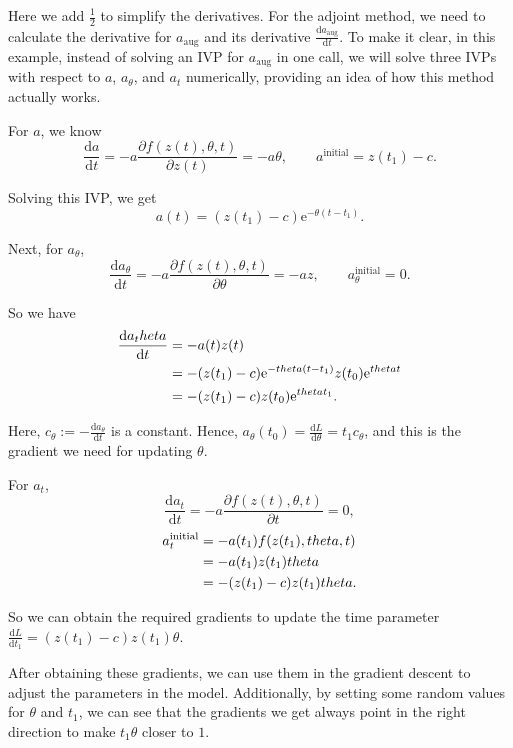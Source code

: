 \documentclass[a4paper,11pt,titlepage]{article}
\theoremstyle{definition}
\theoremstyle{plain}
\theoremstyle{remark}
\begin{document}
Here we add $\frac{1}{2}$ to simplify the derivatives.
For the adjoint method, we need to calculate the derivative for $a_{\mathrm{aug}}$ and its derivative $\frac{\mathrm{d}a_{\mathrm{aug}}}{\mathrm{d}t}$. To make it clear, in this example, instead of solving an IVP for $a_{\mathrm{aug}}$ in one call, we will solve three IVPs with respect to $a$, $a_\theta$, and $a_t$ numerically, providing an idea of how this method actually works.

For $a$, we know $$\frac{\mathrm{d}{a}}{\mathrm{d}{t}}=-a\frac{\partial f(z(t),\theta,t)}{\partial z(t)}=-a\theta,\quad\quad a^{\mathrm{initial}} = z(t_1)-c.$$

Solving this IVP, we get $$a(t)= (z(t_1)-c)\mathrm{e}^{-\theta(t-t_1)}.$$

Next, for $a_\theta$, $$\frac{\mathrm{d}{a_\theta}}{\mathrm{d}{t}}=-a\frac{\partial f(z(t),\theta,t)}{\partial \theta}=-az,\quad\quad a^{\mathrm{initial}}_\theta=0.$$

So we have
\begin{align}
\frac{\mathrm{d}{a_\theta}}{\mathrm{d}{t}}&=-a(t)z(t)\notag\\
&= -(z(t_1)-c)\mathrm{e}^{-\theta(t-t_1)}z(t_0)\mathrm{e}^{\theta t}\notag\\
&= -(z(t_1)-c)z(t_0)\mathrm{e}^{\theta t_1}.\notag
\end{align}

Here, $c_\theta:=-\frac{\mathrm{d}{a_\theta}}{\mathrm{d}{t}}$ is a constant. Hence, $a_\theta(t_0) =\frac{\mathrm{d}L}{\mathrm{d}\theta} =t_1c_\theta$, and this is the gradient we need for updating $\theta$.

For $a_t$,
$$
\frac{\mathrm{d}{a_t}}{\mathrm{d}{t}}=-a\frac{\partial f(z(t),\theta,t)}{\partial t}=0,
$$
\begin{align}
a^{\mathrm{initial}}_t &= -a(t_1)f(z(t_1),\theta,t)\notag\\
&=-a(t_1)z(t_1)\theta\notag\\
&=-(z(t_1)-c)z(t_1)\theta.\notag
\end{align}

So we can obtain the required gradients to update the time parameter $\frac{\mathrm{d}L}{\mathrm{d}t_1}=(z(t_1)-c)z(t_1)\theta$.

After obtaining these gradients, we can use them in the gradient descent to adjust the parameters in the model. Additionally, by setting some random values for $\theta$ and $t_1$, we can see that the gradients we get always point in the right direction to make $t_1\theta$ closer to $1$.
\end{document}
